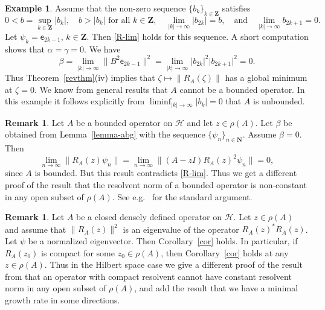 \documentclass[12pt,a4paper]{article}
\numberwithin{equation}{section}
\theoremstyle{plain}
\theoremstyle{definition}
\newtheorem{remark}[theorem]{Remark}
\newtheorem{example}[theorem]{Example}
\newcommand{\abs}[1]{\lvert{#1}\rvert}  %
\newcommand{\norm}[1]{\lVert{#1}\rVert} %
\newcommand{\cH}{\mathcal{H}}
\newcommand{\bN}{\mathbf{N}}
\newcommand{\bZ}{\mathbf{Z}}
\newcommand{\be}[1]{\mathsf{e}_{#1}}
\begin{document}
\begin{example}
	Assume that the non-zero sequence $\{b_k\}_{k\in\bZ}$ satisfies
	\begin{equation*}
		0<b=\sup_{k\in\bZ}\abs{b_k}, \quad b>\abs{b_k} \text{ for all } k\in\bZ, \quad \lim_{\abs{k}\to\infty}\abs{b_{2k}} = b, \quad\text{and}\quad \lim_{\abs{k}\to\infty}b_{2k+1} = 0.
	\end{equation*}
	Let $\psi_k=\be{2k-1}$, $k\in\bZ$. Then \eqref{R-lim} holds for this sequence. A short computation shows that $\alpha=\gamma=0$. We have
	\begin{equation*}
		\beta=\lim_{\abs{k}\to\infty}\norm{B^2\be{2k-1}}^2 = \lim_{\abs{k}\to\infty}\abs{b_{2k}}^2\abs{b_{2k+1}}^2=0.
	\end{equation*}
	Thus Theorem~\ref{revthm}(iv) implies that $\zeta\mapsto\norm{R_A(\zeta)}$ has a global minimum at $\zeta=0$. We know from general results that $A$ cannot be a bounded operator. In this example it follows explicitly from $\liminf_{\abs{k}\to\infty}\abs{b_k}=0$ that $A$ is unbounded.
\end{example}

\begin{remark}\label{rem30}
	Let $A$ be a bounded operator on $\cH$ and let $z\in\rho(A)$. Let $\beta$ be obtained from Lemma~\ref{lemma-abg} with the sequence $\{\psi_n\}_{n\in\bN}$. Assume $\beta=0$. Then
	\begin{equation*}
		\lim_{n\to\infty}\norm{R_A(z)\psi_n} = \lim_{n\to\infty}\norm{(A-zI)R_A(z)^2\psi_n} = 0,
	\end{equation*}
	since $A$ is bounded. But this result contradicts \eqref{R-lim}. Thus we get a different proof of the result that the resolvent norm of a bounded operator is non-constant in any open subset of $\rho(A)$. See e.g.~\cite{BS} for the standard argument.
\end{remark}

\begin{remark}\label{rem31}
	Let $A$ be a closed densely defined operator on $\cH$. Let $z\in\rho(A)$ and assume that $\norm{R_A(z)}^2$ is an eigenvalue of the operator $R_A(z)^{\ast}R_A(z)$. Let $\psi$ be a normalized eigenvector. Then Corollary~\ref{cor} holds. In particular, if $R_A(z_0)$ is compact for some $z_0\in\rho(A)$, then Corollary~\ref{cor} holds at any $z\in\rho(A)$. Thus in the Hilbert space case we give a different proof of the result from \cite{DS} that an operator with compact resolvent cannot have constant resolvent norm in any open subset of $\rho(A)$, and add the result that we have a minimal growth rate in some directions.
\end{remark}
\end{document}

